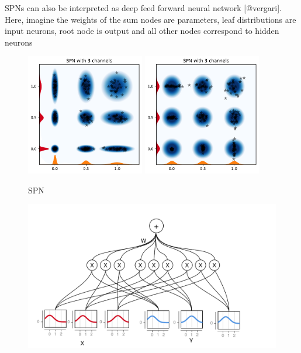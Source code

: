 SPNs can also be interpreted as deep feed forward neural network [@vergari]. Here, imagine the
weights of the sum nodes are parameters, leaf distributions are input neurons, root node is output and
all other nodes correspond to hidden neurons


\begin{figure}[H]%
    \centering
    {\includegraphics[width=0.46\textwidth]{Pictures/SPN_illustration1.pdf} }%
    \qquad
   {\includegraphics[width=0.46\textwidth]{Pictures/SPN_illustration2.pdf} }%
    \caption{SPN}%
    \label{SPN_fig}%
\end{figure}

\begin{figure}[H]
    \centering
    \includegraphics[width=\textwidth]{Figures/SPN_graph2.pdf}
\end{figure}




